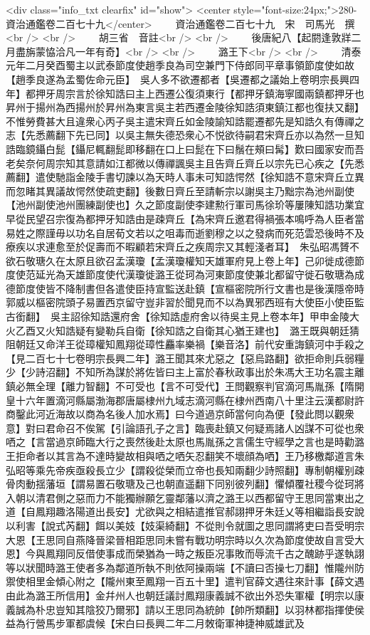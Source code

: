 <div class="info_txt clearfix" id="show">
<center style="font-size:24px;">280-資治通鑑卷二百七十九</center>
  　　資治通鑑卷二百七十九　宋　司馬光　撰<br />
<br />
　　胡三省　音註<br />
<br />
　　後唐紀八【起閼逢敦牂二月盡旃蒙恊洽凡一年有奇】<br />
<br />
　　潞王下<br />
<br />
　　清泰元年二月癸酉蜀主以武泰節度使趙季良為司空兼門下侍郎同平章事領節度使如故【趙季良遂為孟蜀佐命元臣】　吳人多不欲遷都者【吳遷都之議始上卷明宗長興四年】都押牙周宗言於徐知誥曰主上西遷公復須東行【都押牙鎮海寧國兩鎮都押牙也昇州于揚州為西揚州於昇州為東言吳主若西遷金陵徐知誥須東鎮江都也復扶又翻】不惟勞費甚大且違衆心丙子吳主遣宋齊丘如金陵諭知誥罷遷都先是知誥久有傳禪之志【先悉薦翻下先已同】以吳主無失德恐衆心不悦欲待嗣君宋齊丘亦以為然一旦知誥臨鏡鑷白髭【鑷尼輒翻髭即移翻在口上曰髭在下曰鬚在頰曰髯】歎曰國家安而吾老矣奈何周宗知其意請如江都微以傳禪諷吳主且告齊丘齊丘以宗先已心疾之【先悉薦翻】遣使馳詣金陵手書切諫以為天時人事未可知誥愕然【徐知誥不意宋齊丘立異而忽睹其異議故愕然使疏吏翻】後數日齊丘至請斬宗以謝吳主乃黜宗為池州副使【池州副使池州團練副使也】久之節度副使李建勲行軍司馬徐玠等屢陳知誥功業宜早從民望召宗復為都押牙知誥由是疎齊丘【為宋齊丘邀君得禍張本鳴呼為人臣者當易姓之際謹毋以功名自居荀文若以之咀毒而逝劉穆之以之發病而死范雲恐後時不及療疾以求連愈至於促壽而不暇顧若宋齊丘之疾周宗又其輕淺者耳】　朱弘昭馮贇不欲石敬瑭久在太原且欲召孟漢瓊【孟漢瓊權知天雄軍府見上卷上年】己卯徙成德節度使范延光為天雄節度使代漢瓊徙潞王從珂為河東節度使兼北都留守徙石敬瑭為成德節度使皆不降制書但各遣使臣持宣監送赴鎮【宣樞密院所行文書也是後漢隱帝時郭威以樞密院頭子易置西京留守豈非習於聞見而不以為異邪西班有大使臣小使臣監古銜翻】　吳主詔徐知誥還府舍【徐知誥虛府舍以待吳主見上卷本年】甲申金陵大火乙酉又火知誥疑有變勒兵自衛【徐知誥之自衛其心猶王建也】　潞王既與朝廷猜阻朝廷又命洋王從璋權知鳳翔從璋性麤率樂禍【樂音洛】前代安重誨鎮河中手殺之【見二百七十七卷明宗長興二年】潞王聞其來尤惡之【惡烏路翻】欲拒命則兵弱糧少【少詩沼翻】不知所為謀於將佐皆曰主上富於春秋政事出於朱馮大王功名震主離鎮必無全理【離力智翻】不可受也【言不可受代】王問觀察判官滴河馬胤孫【隋開皇十六年置滴河縣屬渤海郡唐屬棣州九域志滴河縣在棣州西南八十里注云漢都尉許商鑿此河近海故以商為名後人加水焉】曰今道過京師當何向為便【發此問以觀衆意】對曰君命召不俟駕【引論語孔子之言】臨喪赴鎮又何疑焉諸人凶謀不可從也衆哂之【言當過京師臨大行之喪然後赴太原也馬胤孫之言儒生守經學之言也是時勸潞王拒命者以其言為不達時變故相與哂之哂矢忍翻笑不壞顔為哂】王乃移檄鄰道言朱弘昭等乘先帝疾亟殺長立少【謂殺從榮而立帝也長知兩翻少詩照翻】專制朝權别疎骨肉動揺藩垣【謂易置石敬瑭及己也朝直遥翻下同别彼列翻】懼傾覆社稷今從珂將入朝以清君側之惡而力不能獨辦願乞靈鄰藩以濟之潞王以西都留守王思同當東出之道【自鳳翔趣洛陽道出長安】尤欲與之相結遣推官郝詡押牙朱廷乂等相繼詣長安說以利害【說式芮翻】餌以美妓【妓渠綺翻】不從則令就圖之思同謂將吏曰吾受明宗大恩【王思同自燕降晉梁晉相距思同未嘗有戰功明宗時以久次為節度使故自言受大恩】今與鳳翔同反借使事成而榮猶為一時之叛臣况事敗而辱流千古之醜跡乎遂執詡等以狀聞時潞王使者多為鄰道所執不則依阿操兩端【不讀曰否操七刀翻】惟隴州防禦使相里金傾心附之【隴州東至鳳翔一百五十里】遣判官薛文遇往來計事【薛文遇由此為潞王所信用】金幷州人也朝廷議討鳳翔康義誠不欲出外恐失軍權【明宗以康義誠為朴忠豈知其陰狡乃爾邪】請以王思同為統帥【帥所類翻】以羽林都指揮使侯益為行營馬步軍都虞候【宋白曰長興二年二月敇衛軍神捷神威雄武及